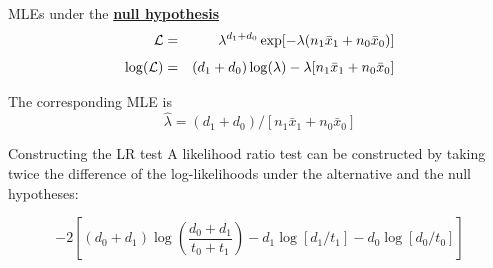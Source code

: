 \documentclass[envcountsect, 10pt, portrait, palatino]{beamer}
\begin{document}
\begin{frame}{MLEs under the  \underline{\bf null hypothesis}}
\begin{eqnarray*}
{\cal L} & = &  \lambda^{d_1+d_0}
     \exp[-\lambda (n_1 \bar{x}_1 + n_0 \bar{x}_0)]\\[1ex]
\log({\cal L}) & = &  (d_1 + d_0) \log(\lambda) - \lambda [ n_1 \bar{x}_1 +
       n_0 \bar{x}_0]
\end{eqnarray*}

The corresponding MLE is
\[ \widehat{\lambda}=(d_1+d_0)/[n_1 \bar{x}_1 + n_0 \bar{x}_0]\]
\end{frame} 
\begin{frame}{Constructing the LR test}
A likelihood ratio test can be constructed by taking twice
the difference of the log-likelihoods under the alternative
and the null hypotheses:

\[ -2 \left[ (d_0+d_1) \log \left(\frac{d_0+d_1}{t_0+t_1}\right) -
d_1 \log[d_1/t_1] - d_0 \log[d_0/t_0] \right] \]
\end{frame} 
\end{document}
